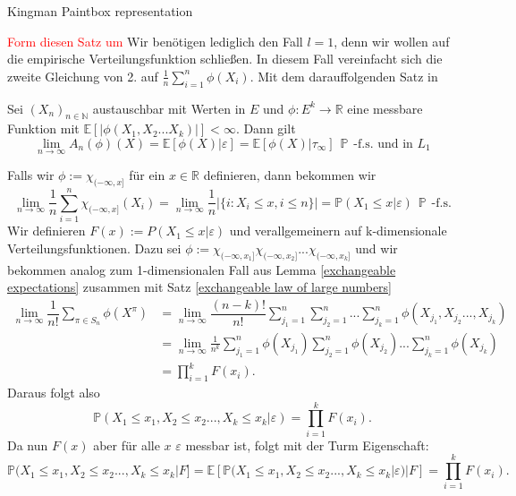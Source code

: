 \begin{section}{Kingman Paintbox representation}
\begin{lemma}
\begin{enumerate}
    \end{enumerate}
\end{lemma}
\textcolor{red}{Form diesen Satz um} Wir benötigen lediglich den Fall $l = 1$, denn wir wollen auf die empirische Verteilungsfunktion schließen. In diesem Fall vereinfacht sich die zweite Gleichung von 2. auf $\frac{1}{n}\sum_{i=1}^{n}\phi(X_i)$. Mit dem darauffolgenden Satz in \cite{NeiningerHS}
\begin{theorem}
\label{exchangeable law of large numbers}
\cite[Satz 8.12]{NeiningerHS}
Sei $(X_n)_{n \in \mathbb{N}}$ austauschbar mit Werten in $E$ und $\phi: E^k \to \mathbb{R}$ eine messbare Funktion mit $\mathbb{E}[|\phi(X_1,X_2 ... X_k)|] < \infty$. Dann gilt
\[
\lim_{n \to \infty}A_n(\phi)(X) = \mathbb{E}[\phi(X)|\varepsilon] = \mathbb{E}[\phi(X)|\tau_\infty]\hspace{5pt} \mathbb{P} \hspace{5pt} \text{-f.s. und in } L_1
\] 
\end{theorem}
Falls wir $\phi := \chi_{(-\infty,x]}$ für ein $x \in \mathbb{R}$ definieren, dann bekommen wir 
\[ \lim_{n \to \infty} \frac{1}{n}\sum_{i=1}^{n} \chi_{(-\infty,x]}(X_i) =  \lim_{n \to \infty} \frac{1}{n}|\{i: X_i \leq x, i \leq n\}| = \mathbb{P}(X_1 \leq x |\varepsilon) \hspace{5pt}\mathbb{P}\hspace{5pt} \text{-f.s.}
\]
Wir definieren $F(x):= P(X_1 \leq x | \varepsilon)$ und verallgemeinern auf k-dimensionale Verteilungsfunktionen. Dazu sei $\phi:= \chi_{(-\infty,x_1]}\chi_{(-\infty,x_2]}...\chi_{(-\infty,x_k]}$ und wir bekommen analog zum 1-dimensionalen Fall aus Lemma \ref{exchangeable expectations} zusammen mit Satz \ref{exchangeable law of large numbers}
\begin{align*}
\lim_{n \to \infty} \dfrac{1}{n!}\sum_{\pi \in S_n} \phi(X^\pi) &= \lim_{n \to \infty}\dfrac{(n-k)!}{n!}\sum_{j_1=1}^{n} \sum_{j_2=1}^{n}...\sum_{j_k=1}^{n} \phi(X_{j_1},X_{j_2}...,X_{j_k}) \\
&= \lim_{n \to \infty} \frac{1}{n^k} \sum_{j_1=1}^{n} \phi(X_{j_1})\sum_{j_2=1}^{n} \phi(X_{j_2})...\sum_{j_k=1}^{n} \phi(X_{j_k})\\
&= \prod_{i=1}^{k}F(x_i).
\end{align*}
Daraus folgt also
\[
\mathbb{P}(X_1 \leq x_1, X_2 \leq x_2..., X_k \leq x_k| \varepsilon) = \prod_{i=1}^k F(x_i).
\]
Da nun $F(x)$ aber für alle $x$ $\varepsilon$ messbar ist, folgt mit der Turm Eigenschaft:
\[
\mathbb{P}(X_1 \leq x_1, X_2 \leq x_2..., X_k \leq x_k|F]  
= \mathbb{E}[\mathbb{P}(X_1 \leq x_1, X_2 \leq x_2..., X_k \leq x_k| \varepsilon)|F] = \prod_{i=1}^k F(x_i).
\]



\end{section}
